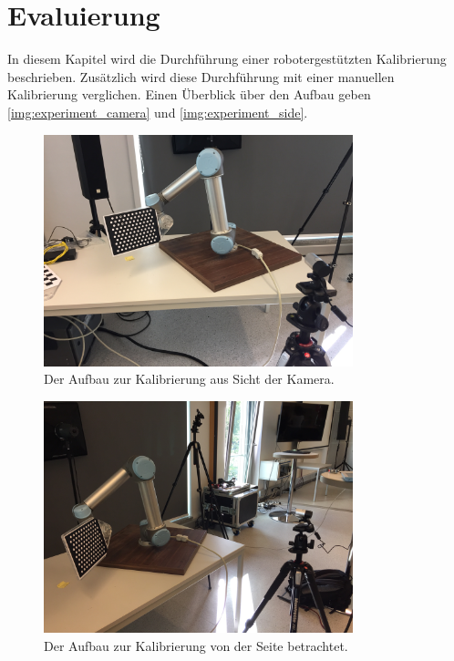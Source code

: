 \chapter{Evaluierung}
\label{chap:evaluierung}
In diesem Kapitel wird die Durchführung einer robotergestützten Kalibrierung beschrieben. Zusätzlich wird diese Durchführung mit einer manuellen Kalibrierung verglichen. Einen Überblick über den Aufbau geben \autoref{img:experiment_camera} und \autoref{img:experiment_side}.
\begin{figure}
\centering
\includegraphics[width=0.8\textwidth]{images/experiment_camera.JPG}
\caption{Der Aufbau zur Kalibrierung aus Sicht der Kamera.}\label{img:experiment_camera}
\end{figure}
\begin{figure}
\centering
\includegraphics[width=0.8\textwidth]{images/experiment_side.JPG}
\caption{Der Aufbau zur Kalibrierung von der Seite betrachtet.}\label{img:experiment_side}
\end{figure}

